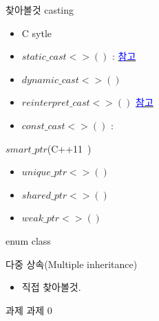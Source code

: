 \documentclass[10pt]{beamer}
\begin{document}
\begin{frame}{찾아볼것}
    casting
    \begin{itemize}
        \item C sytle 
        \item $static\_cast<>()$ : \href{https://stackoverflow.com/questions/28002/regular-cast-vs-static-cast-vs-dynamic-cast}{\textcolor{blue}{참고}}
        \item $dynamic\_cast<>()$ 
        \item $reinterpret\_cast<>()$ \href{https://stackoverflow.com/questions/573294/when-to-use-reinterpret-cast}{\textcolor{blue}{참고}}
        \item $const\_cast<>()$ : 
    \end{itemize}
    $smart\_ptr$(C++11~)
    \begin{itemize}
        \item $unique\_ptr<>()$
        \item $shared\_ptr<>()$
        \item $weak\_ptr<>()$
    \end{itemize}
    enum class
\end{frame}




\begin{frame}{다중 상속(Multiple inheritance)}
    \begin{itemize}
        \item 직접 찾아볼것.
    \end{itemize}    
\end{frame}    



\begin{frame}{과제}
    과제 0
\end{frame}    
\end{document}
